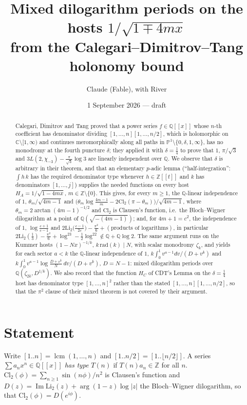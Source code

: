 \documentclass[11pt]{amsart}
\title[Mixed dilogarithm periods on $1/\sqrt{1\mp4mx}$]{Mixed dilogarithm periods on the hosts $1/\sqrt{1\mp4mx}$\\ from the Calegari--Dimitrov--Tang holonomy bound}
\author{Claude (Fable), with River}
\date{1 September 2026 --- draft}
\theoremstyle{remark}
\newcommand{\Q}{\mathbb Q}\newcommand{\Z}{\mathbb Z}\newcommand{\R}{\mathbb R}\newcommand{\C}{\mathbb C}
\newcommand{\PP}{\mathbb P}\newcommand{\D}{\mathbb D}\newcommand{\T}{\mathbb T}\newcommand{\Cl}{\mathrm{Cl}_2}\newcommand{\Li}{\mathrm{Li}_2}
\newcommand{\lcm}[1]{[1..#1]}
\begin{document}
\begin{abstract}
Calegari, Dimitrov and Tang proved that a power series $f\in\Q[[x]]$ whose $n$-th coefficient has denominator dividing $[1,\dots,n][1,\dots,n/2]$, which is holomorphic on $\C\setminus[1,\infty)$ and continues meromorphically along all paths in $\PP^1\setminus\{0,\delta,1,\infty\}$, has no monodromy at the fourth puncture $\delta$; they applied it with $\delta=\tfrac14$ to prove that $1$, $\pi/\sqrt3$ and $3L(2,\chi_{-3})-\frac{\pi}{\sqrt3}\log3$ are linearly independent over $\Q$. We observe that $\delta$ is arbitrary in their theorem, and that an elementary $p$-adic lemma (``half-integration'': $\int h\,k$ has the required denominator type whenever $h\in\Z[[t]]$ and $k$ has denominators $[1,\dots,j]$) supplies the needed functions on every host $H_A=1/\sqrt{1-4mx}$, $m\in\Z\setminus\{0\}$. This gives, for every $m\ge1$, the $\Q$-linear independence of $1$, $\theta_m/\sqrt{4m-1}$ and $\bigl(\theta_m\log\frac{4m-1}m-2\Cl(\pi-\theta_m)\bigr)/\sqrt{4m-1}$, where $\theta_m=2\arctan(4m-1)^{-1/2}$ and $\Cl$ is Clausen's function, i.e.\ the Bloch--Wigner dilogarithm at a point of $\Q(\sqrt{-(4m-1)})$; and, for $4m+1=c^2$, the independence of $1$, $\log\frac{c+1}{c-1}$ and $2\Li\bigl(\frac{c-1}{2c}\bigr)-\frac{\pi^2}6+(\text{products of logarithms})$, in particular $2\Li(\tfrac13)-\frac{\pi^2}6+\log^23-\frac12\log^22\notin\Q+\Q\log2$. The same argument runs on the Kummer hosts $(1-Nx)^{-1/k}$, $k\,\mathrm{rad}(k)\mid N$, with scalar monodromy $\zeta_k$, and yields for each sector $a<k$ the $\Q$-linear independence of $1$, $k\int_0^1v^{a-1}dv/(D+v^k)$ and $k\int_0^1v^{a-1}\log\frac{D+v^k}{N}\,dv/(D+v^k)$, $D=N-1$: mixed dilogarithm periods over $\Q(\zeta_{2k},D^{1/k})$. We also record that the function $H_C$ of CDT's Lemma on the $\delta=\frac14$ host has denominator type $[1,\dots,n]^2$ rather than the stated $[1,\dots,n][1,\dots,n/2]$, so that the $\pi^2$ clause of their mixed theorem is not covered by their argument.
\end{abstract}
\maketitle

\section{Statement}
Write $\lcm n=\operatorname{lcm}(1,\dots,n)$ and $\lcm{n/2}=\lcm{\lfloor n/2\rfloor}$. A series $\sum a_nx^n\in\Q[[x]]$ \emph{has type} $T(n)$ if $T(n)a_n\in\Z$ for all $n$. $\Cl(\phi)=\sum_{n\ge1}\sin(n\phi)/n^2$ is Clausen's function and $D(z)=\operatorname{Im}\Li(z)+\arg(1-z)\log|z|$ the Bloch--Wigner dilogarithm, so that $\Cl(\phi)=D(e^{i\phi})$.
\end{document}
